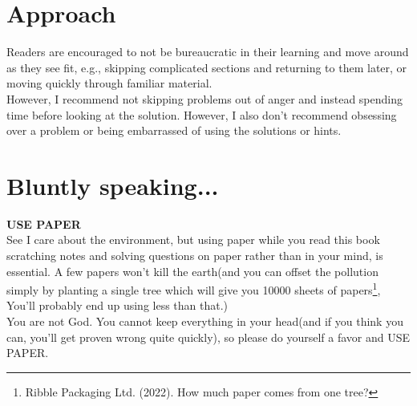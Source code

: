\section{Approach}
Readers are encouraged to not be bureaucratic in their learning and move around as they see fit, e.g., skipping complicated sections and returning to them later, or moving quickly through familiar material.\\
However, I recommend not skipping problems out of anger and instead spending time before looking at the solution. However, I also don't recommend obsessing over a problem or being embarrassed of using the solutions or hints. \\
\section{Bluntly speaking...}
\textbf{USE PAPER}\\
See I care about the environment, but using paper while you read this book scratching notes and solving questions on paper rather than in your mind, is essential. A few papers won't kill the earth(and you can offset the pollution simply by planting a single tree which will give you 10000 sheets of papers\footnote{Ribble Packaging Ltd. (2022). How much paper comes from one tree?}, You'll probably end up using less than that.)\\
You are not God. You cannot keep everything in your head(and if you think you can, you'll get proven wrong quite quickly), so please do yourself a favor and USE PAPER.\\
